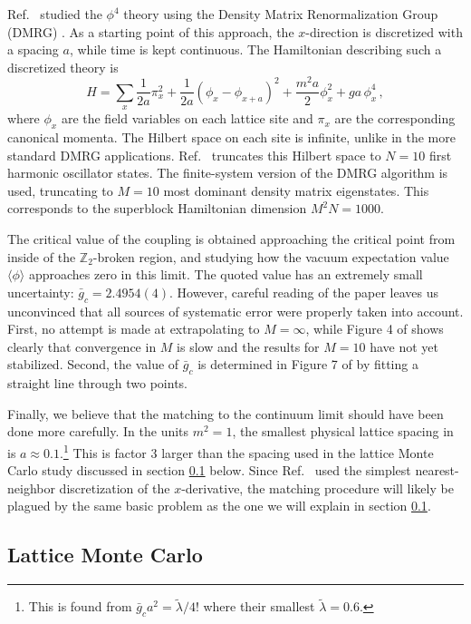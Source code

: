 \documentclass[11pt]{article}
\newcommand{\beq}{\begin{equation}}
\newcommand{\eeq}{\end{equation}}
\def\bZ {\mathbb{Z}}
\def\bZ {\mathbb{Z}}
\numberwithin{equation}{section}
\begin{document}
Ref.~\cite{Sugihara:2004qr} studied the $\phi^4$ theory using the Density Matrix Renormalization Group (DMRG) \cite{WhitePRB}. As a starting point of this approach, the $x$-direction is discretized with a spacing $a$, while time is kept continuous. The Hamiltonian describing such a discretized theory is
\beq
\label{eq:dmrg}
H=\sum_x \frac{1}{2a}\pi_x^2 + \frac{1}{2a}(\phi_x-\phi_{x+a})^2+\frac {m^2 a}{2} \phi_x^2 + ga \,\phi_x^4\,,
\eeq
where $\phi_x$ are the field variables on each lattice site and $\pi_x$ are the corresponding canonical momenta. The Hilbert space on each site is infinite, unlike in the more standard DMRG applications. Ref.~\cite{Sugihara:2004qr} truncates this Hilbert space to $N=10$ first harmonic oscillator states. The finite-system version of the DMRG algorithm \cite{WhitePRB} is used, truncating to $M=10$ most dominant density matrix eigenstates. This corresponds to the superblock Hamiltonian dimension $M^2 N=1000$. 

The critical value of the coupling is obtained approaching the critical point from inside of the $\bZ_2$-broken region, and studying how the vacuum expectation value $\langle \phi \rangle$ approaches zero in this limit. The quoted value has an extremely small uncertainty: $\bar g_c=2.4954(4)$. However, careful reading of the paper leaves us unconvinced that all sources of systematic error were properly taken into account. First, no attempt is made at extrapolating to $M=\infty$, while Figure 4 of \cite{Sugihara:2004qr} shows clearly that convergence in $M$ is slow and the results for $M=10$ have not yet stabilized. Second, the value of $\bar g_c$ is determined in Figure 7 of \cite{Sugihara:2004qr} by fitting a straight line through two points. 

Finally, we believe that the matching to the continuum limit should have been done more carefully. 
In the units $m^2=1$, the smallest physical lattice spacing in \cite{Sugihara:2004qr} is $a\approx 0.1$.\footnote{This is found from $\bar{g}_c a^2=\tilde \lambda/4!$ where their smallest $\tilde \lambda=0.6$.} 
This is factor 3 larger than the spacing used in the lattice Monte Carlo study \cite{Schaich:2009jk} discussed in section \ref{sec:MC} below. Since Ref.~\cite{Sugihara:2004qr} used the simplest nearest-neighbor discretization of the $x$-derivative, the matching procedure will likely be plagued by the same basic problem as the one we will explain in section \ref{sec:MC}.

\subsection{Lattice Monte Carlo}
\label{sec:MC}
\end{document}

